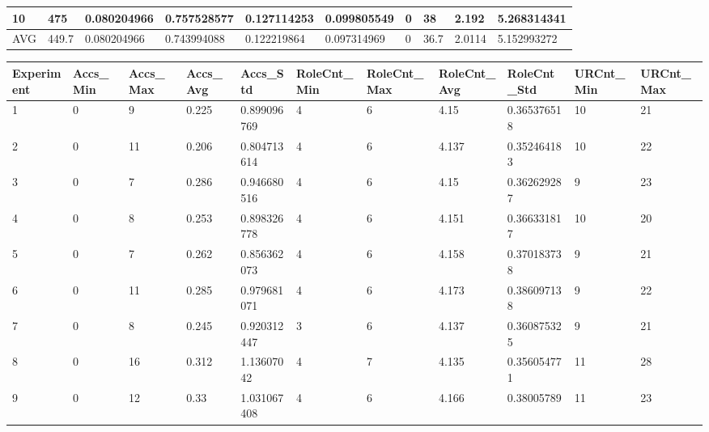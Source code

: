\begin{table}[H]
\begin{adjustbox}{max width=360pt,keepaspectratio,angle=90}
\begin{tabular}{|l|l|l|l|l|l|l|l|l|l|}
					10         & 475   & 0.080204966  & 0.757528577  & 0.127114253  & 0.099805549  & 0         & 38        & 2.192     & 5.268314341 \\ \hline
					AVG        & 449.7 & 0.080204966  & 0.743994088  & 0.122219864  & 0.097314969  & 0         & 36.7      & 2.0114    & 5.152993272 \\ \hline
				\end{tabular}
			\end{adjustbox}
			\begin{adjustbox}{max width=380pt,keepaspectratio,angle=90}
				\begin{tabular}{|l|l|l|l|l|l|l|l|l|l|l|}
					\hline
					\rowcolor[HTML]{EFEFEF} 
					Experiment & Accs\_Min & Accs\_Max & Accs\_Avg & Accs\_Std   & RoleCnt\_Min & RoleCnt\_Max & RoleCnt\_Avg & RoleCnt\_Std & URCnt\_Min & URCnt\_Max \\ \hline
					1          & 0         & 9         & 0.225     & 0.899096769 & 4            & 6            & 4.15         & 0.365376518  & 10         & 21         \\ \hline
					2          & 0         & 11        & 0.206     & 0.804713614 & 4            & 6            & 4.137        & 0.352464183  & 10         & 22         \\ \hline
					3          & 0         & 7         & 0.286     & 0.946680516 & 4            & 6            & 4.15         & 0.362629287  & 9          & 23         \\ \hline
					4          & 0         & 8         & 0.253     & 0.898326778 & 4            & 6            & 4.151        & 0.366331817  & 10         & 20         \\ \hline
					5          & 0         & 7         & 0.262     & 0.856362073 & 4            & 6            & 4.158        & 0.370183738  & 9          & 21         \\ \hline
					6          & 0         & 11        & 0.285     & 0.979681071 & 4            & 6            & 4.173        & 0.386097138  & 9          & 22         \\ \hline
					7          & 0         & 8         & 0.245     & 0.920312447 & 3            & 6            & 4.137        & 0.360875325  & 9          & 21         \\ \hline
					8          & 0         & 16        & 0.312     & 1.13607042  & 4            & 7            & 4.135        & 0.356054771  & 11         & 28         \\ \hline
					9          & 0         & 12        & 0.33      & 1.031067408 & 4            & 6            & 4.166        & 0.38005789   & 11         & 23         \\ \hline

\end{tabular}
\end{adjustbox}
\end{table}
